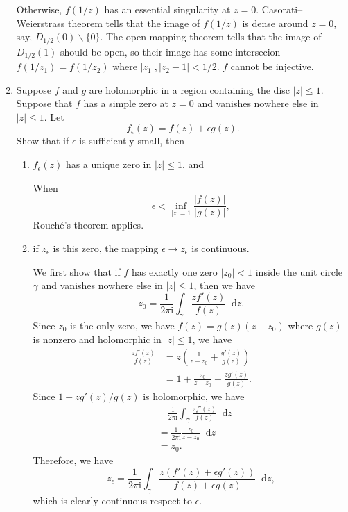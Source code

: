 \documentclass[11pt]{report}
\theoremstyle{mythm}
\let\oldendproof\endproof
\renewenvironment{proof}[1][\proofname]{%
  \oldproof[\normalfont \bfseries #1]%
}{\oldendproof}
\renewcommand*{\proofname}{Proof}
\theoremstyle{myans}
\newcommand{\mi}{\mathrm{i}}
\newcommand{\dd}{\mathop{}\!\mathrm{d}}
\begin{document}
\begin{enumerate}
\begin{proof}
    Otherwise, $f(1/z)$ has an essential singularity at $z=0$. Casorati--Weierstrass theorem
    tells that the image of $f(1/z)$ is dense around $z=0$, say, $D_{1/2}(0) \smallsetminus\{0\}$.
    The open mapping theorem tells that the image of $D_{1/2}(1)$ should be open,
    so their image has some intersecion $f(1/z_1) = f(1/z_2)$ where $|z_1|, |z_2-1| < 1/2$.
    $f$ cannot be injective.
  \end{proof}
  \setcounter{enumi}{15}
  \item Suppose $f$ and $g$ are holomorphic in a region containing the disc $|z| \leq 1$. Suppose that
  $f$ has a simple zero at $z = 0$ and vanishes nowhere else in $|z| \leq 1$. Let
  \[ f_\epsilon(z) = f(z) + \epsilon g(z). \]
  Show that if $\epsilon$ is sufficiently small, then
  \begin{enumerate}
    \item $f_\epsilon(z)$ has a unique zero in $|z| \leq 1$, and
    \begin{proof}
      When
      \[ \epsilon < \inf_{|z|=1} \frac{|f(z)|}{|g(z)|}, \]
      Rouch\'e's theorem applies.
    \end{proof}
    \item if $z_\epsilon$ is this zero, the mapping $\epsilon\to z_\epsilon$ is continuous.
    \begin{proof}
      We first show that if $f$ has exactly one zero $|z_0|<1$ inside the unit circle $\gamma$ and vanishes
      nowhere else in $|z|\leq 1$, then we have
      \[ z_0 = \frac 1{2\pi \mi} \int_\gamma \frac{z f'(z)}{f(z)} \dd z. \]
      Since $z_0$ is the only zero, we have $f(z) = g(z)(z-z_0)$ where $g(z)$ is nonzero and
      holomorphic in $|z|\leq 1$, we have
      \begin{align*}
        \frac{zf'(z)}{f(z)} &= z\left( \frac{1}{z-z_0} + \frac{g'(z)}{g(z)} \right)\\
        &= 1 + \frac{z_0}{z-z_0} + \frac{zg'(z)}{g(z)}.
      \end{align*}
      Since $1 + zg'(z)/g(z)$ is holomorphic, we have
      \begin{align*}
        &\quad \frac 1{2\pi \mi} \int_\gamma \frac{zf'(z)}{f(z)}\dd z\\
        &= \frac 1{2\pi \mi} \frac{z_0}{z-z_0}\dd z\\
        &= z_0.
      \end{align*}
      Therefore, we have
      \[ z_\epsilon = \frac 1{2\pi \mi} \int_\gamma \frac{z(f'(z)+\epsilon g'(z))}{f(z)+\epsilon g(z)} \dd z, \]
      which is clearly continuous respect to $\epsilon$.

\end{proof}
\end{enumerate}
\end{enumerate}
\end{document}
